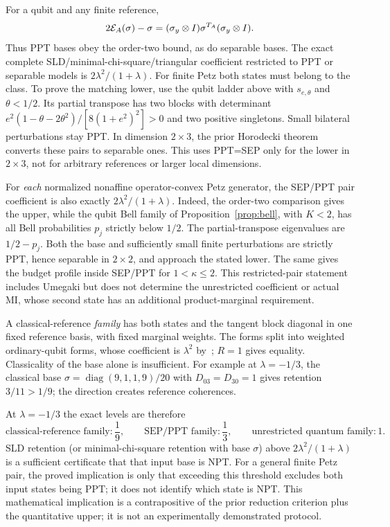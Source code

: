 For a qubit and any finite reference,
\[
 2\mathcal E_A(\sigma)-\sigma=(\sigma_y\otimes I)\sigma^{T_A}(\sigma_y\otimes I).
\]
Thus PPT bases obey the order-two bound, as do separable bases. The exact complete SLD/minimal-chi-square/triangular coefficient restricted to PPT or separable models is
\(2\lambda^2/(1+\lambda)\). For finite Petz both states must belong to the class.
To prove the matching lower, use the qubit ladder above with \(s_{e,\theta}\) and \(\theta<1/2\). Its partial transpose has two blocks with determinant
\(e^2(1-\theta-2\theta^2)/[8(1+e^2)^2]>0\) and two positive singletons. Small bilateral perturbations stay PPT. In dimension \(2\times3\), the prior Horodecki theorem~\cite{HHH} converts these pairs to separable ones. This uses PPT=SEP only for the lower in \(2\times3\), not for arbitrary references or larger local dimensions.

For \emph{each} normalized nonaffine operator-convex Petz generator, the SEP/PPT pair coefficient is also exactly \(2\lambda^2/(1+\lambda)\). Indeed, the order-two comparison gives the upper, while the qubit Bell family of Proposition~\ref{prop:bell}, with \(K<2\), has all Bell probabilities \(p_j\) strictly below \(1/2\). The partial-transpose eigenvalues are \(1/2-p_j\). Both the base and sufficiently small finite perturbations are strictly PPT, hence separable in \(2\times2\), and approach the stated lower. The same gives the budget profile inside SEP/PPT for \(1<\kappa\le2\). This restricted-pair statement includes Umegaki but does not determine the unrestricted coefficient or actual MI, whose second state has an additional product-marginal requirement.

A classical-reference \emph{family} has both states and the tangent block diagonal in one fixed reference basis, with fixed marginal weights. The forms split into weighted ordinary-qubit forms, whose coefficient is \(\lambda^2\) by~\cite{HR}; \(R=1\) gives equality. Classicality of the base alone is insufficient. For example at \(\lambda=-1/3\), the classical base \(\sigma=\operatorname{diag}(9,1,1,9)/20\) with \(D_{03}=D_{30}=1\) gives retention \(3/11>1/9\); the direction creates reference coherences.

At \(\lambda=-1/3\) the exact levels are therefore
\[
 \text{classical-reference family}:\frac19,\qquad
 \text{SEP/PPT family}:\frac13,\qquad
 \text{unrestricted quantum family}:1.
\]
SLD retention (or minimal-chi-square retention with base \(\sigma\)) above \(2\lambda^2/(1+\lambda)\) is a sufficient certificate that that input base is NPT. For a general finite Petz pair, the proved implication is only that exceeding this threshold excludes both input states being PPT; it does not identify which state is NPT. This mathematical implication is a contrapositive of the prior reduction criterion plus the quantitative upper; it is not an experimentally demonstrated protocol.
